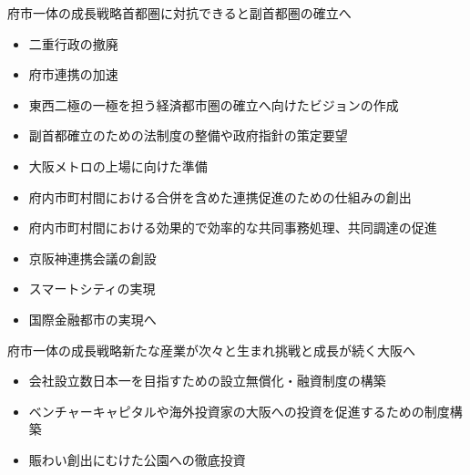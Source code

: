 \documentclass[dvipdfmx]{beamer}
\begin{document}
    \begin{frame}{府市一体の成長戦略}{首都圏に対抗できると副首都圏の確立へ}
        \begin{small}
            \begin{itemize}
                \setlength{\itemsep}{1.5mm}
                \item 二重行政の撤廃
                \item 府市連携の加速
                \item 東西二極の一極を担う経済都市圏の確立へ向けたビジョンの作成
                \item 副首都確立のための法制度の整備や政府指針の策定要望
                \item 大阪メトロの上場に向けた準備
                \item 府内市町村間における合併を含めた連携促進のための仕組みの創出
                \item \alert{府内市町村間における効果的で効率的な共同事務処理、共同調達の促進}
                \item 京阪神連携会議の創設
                \item スマートシティの実現
                \item 国際金融都市の実現へ
            \end{itemize}
        \end{small}
    \end{frame}

    \begin{frame}{府市一体の成長戦略}{新たな産業が次々と生まれ挑戦と成長が続く大阪へ}
        \begin{small}
            \begin{itemize}
                \setlength{\itemsep}{5mm}
                \item 会社設立数日本一を目指すための設立無償化・融資制度の構築
                \hspace{.2mm}
                \item ベンチャーキャピタルや海外投資家の大阪への投資を促進するための制度構築
                \item 賑わい創出にむけた公園への徹底投資
            \end{itemize}
        \end{small}
    \end{frame}
\end{document}
